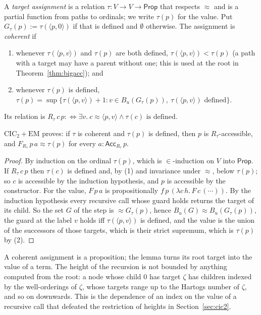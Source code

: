 \documentclass[10pt]{article}
\newcommand{\Prop}{\mathsf{Prop}}
\newcommand{\CIC}{\mathrm{CIC}}
\newcommand{\EM}{\mathrm{EM}}
\newcommand{\Acc}{\mathsf{Acc}}
\begin{document}
\begin{definition}\label{def:coherent}
A \emph{target assignment} is a relation $\tau:V\to V\to\Prop$ that
respects $\approx$ and is a partial function from paths to ordinals; we
write $\tau(p)$ for the value. Put $G_\tau(p):=\tau(\langle p,0\rangle)$ if
that is defined and $\emptyset$ otherwise. The assignment is
\emph{coherent} if
\begin{enumerate}
\item whenever $\tau(\langle p,v\rangle)$ and $\tau(p)$ are both defined,
  $\tau(\langle p,v\rangle)<\tau(p)$ (a path with a target may have a parent
  without one; this is used at the root in Theorem~\ref{thm:bigacc}); and
\item whenever $\tau(p)$ is defined,
  $\tau(p)=\sup\{\tau(\langle p,v\rangle)+1: v\in B_u(G_\tau(p)),\ \tau(\langle p,v\rangle)\text{ defined}\}$.
\end{enumerate}
Its relation is $R_\tau\,c\,p:\Longleftrightarrow\exists v.\ c\approx\langle p,v\rangle\wedge\tau(c)\text{ is defined}$.
\end{definition}

\begin{lemma}[materialization]\label{lem:mat}
$\CIC_2+\EM$ proves: if $\tau$ is coherent and $\tau(p)$ is defined, then
$p$ is $R_\tau$-accessible, and $F_{R_\tau}\,p\,a\approx\tau(p)$ for every
$a:\Acc_{R_\tau}\,p$.
\end{lemma}
\begin{proof}
By induction on the ordinal $\tau(p)$, which is $\in$-induction on $V$ into
$\Prop$. If $R_\tau\,c\,p$ then $\tau(c)$ is defined and, by (1) and
invariance under $\approx$, below $\tau(p)$; so $c$ is accessible by the
induction hypothesis, and $p$ is accessible by the constructor. For the
value, $F\,p\,a$ is propositionally $f\,p\,(\lambda c\,h.\,F\,c\,(\cdots))$. By
the induction hypothesis every recursive call whose guard holds returns
the target of its child. So the set $G$ of the step is
$\approx G_\tau(p)$, hence $B_u(G)\approx B_u(G_\tau(p))$, the guard at the label
$v$ holds iff $\tau(\langle p,v\rangle)$ is defined, and the value is the
union of the successors of those targets, which is their strict
supremum, which is $\tau(p)$ by (2).
\end{proof}

A coherent assignment is a proposition; the lemma turns its root target
into the value of a term. The height of the recursion is not bounded by
anything computed from the root: a node whose child $0$ has target
$\zeta$ has children indexed by the well-orderings of $\zeta$, whose
targets range up to the Hartogs number of $\zeta$, and so on downwards.
This is the dependence of an index on the value of a recursive call that
defeated the restriction of heights in Section~\ref{sec:cic2}.
\end{document}
